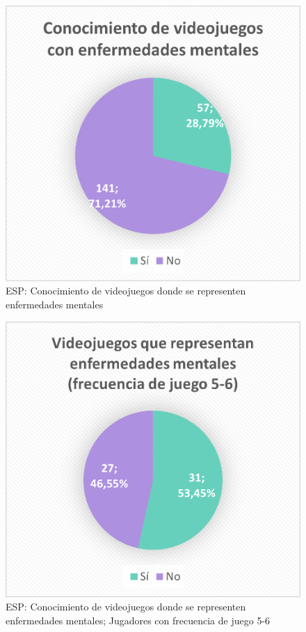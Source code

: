 \documentclass[12pt, a4paper,twoside,titlepage]{book}
\begin{document}
\begin{figure}
    \centering
    \includegraphics[width=.7\linewidth]{ANEXO ESP/12AnexESPVidenf}
    \caption{ESP: Conocimiento de videojuegos donde se representen enfermedades mentales}
    \label{fig:ESPConvid}
\end{figure}

\begin{figure}
    \centering
    \includegraphics[width=.7\linewidth]{ANEXO ESP/13AnexESPConvid56}
    \caption{ESP: Conocimiento de videojuegos donde se representen enfermedades mentales; Jugadores con frecuencia de juego 5-6}
    
\end{figure}
\end{document}
